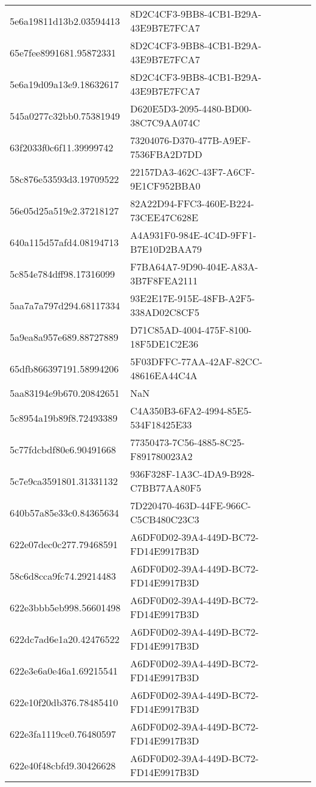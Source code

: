 \begin{tabular}{ll}
5e6a19811d13b2.03594413 & 8D2C4CF3-9BB8-4CB1-B29A-43E9B7E7FCA7 \\
65e7fee8991681.95872331 & 8D2C4CF3-9BB8-4CB1-B29A-43E9B7E7FCA7 \\
5e6a19d09a13e9.18632617 & 8D2C4CF3-9BB8-4CB1-B29A-43E9B7E7FCA7 \\
545a0277c32bb0.75381949 & D620E5D3-2095-4480-BD00-38C7C9AA074C \\
63f2033f0c6f11.39999742 & 73204076-D370-477B-A9EF-7536FBA2D7DD \\
58c876e53593d3.19709522 & 22157DA3-462C-43F7-A6CF-9E1CF952BBA0 \\
56e05d25a519e2.37218127 & 82A22D94-FFC3-460E-B224-73CEE47C628E \\
640a115d57afd4.08194713 & A4A931F0-984E-4C4D-9FF1-B7E10D2BAA79 \\
5c854e784dff98.17316099 & F7BA64A7-9D90-404E-A83A-3B7F8FEA2111 \\
5aa7a7a797d294.68117334 & 93E2E17E-915E-48FB-A2F5-338AD02C8CF5 \\
5a9ea8a957e689.88727889 & D71C85AD-4004-475F-8100-18F5DE1C2E36 \\
65dfb866397191.58994206 & 5F03DFFC-77AA-42AF-82CC-48616EA44C4A \\
5aa83194e9b670.20842651 & NaN \\
5c8954a19b89f8.72493389 & C4A350B3-6FA2-4994-85E5-534F18425E33 \\
5c77fdcbdf80e6.90491668 & 77350473-7C56-4885-8C25-F891780023A2 \\
5c7e9ca3591801.31331132 & 936F328F-1A3C-4DA9-B928-C7BB77AA80F5 \\
640b57a85e33c0.84365634 & 7D220470-463D-44FE-966C-C5CB480C23C3 \\
622e07dec0c277.79468591 & A6DF0D02-39A4-449D-BC72-FD14E9917B3D \\
58c6d8cca9fc74.29214483 & A6DF0D02-39A4-449D-BC72-FD14E9917B3D \\
622e3bbb5eb998.56601498 & A6DF0D02-39A4-449D-BC72-FD14E9917B3D \\
622dc7ad6e1a20.42476522 & A6DF0D02-39A4-449D-BC72-FD14E9917B3D \\
622e3e6a0e46a1.69215541 & A6DF0D02-39A4-449D-BC72-FD14E9917B3D \\
622e10f20db376.78485410 & A6DF0D02-39A4-449D-BC72-FD14E9917B3D \\
622e3fa1119ce0.76480597 & A6DF0D02-39A4-449D-BC72-FD14E9917B3D \\
622e40f48cbfd9.30426628 & A6DF0D02-39A4-449D-BC72-FD14E9917B3D \\

\end{tabular}
